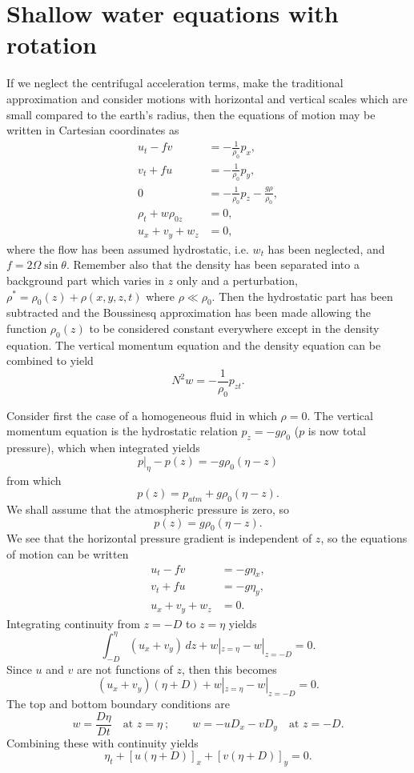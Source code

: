 \section{Shallow water equations with rotation}

If we neglect the centrifugal acceleration terms, make the traditional approximation
and consider motions with horizontal and vertical scales which are small compared to
the earth's radius, then the equations of motion may be written in Cartesian
coordinates as
\begin{align*}
	u_t-fv            & =-\frac{1}{\rho_0}p_x,                      \\
	v_t+fu            & =-\frac{1}{\rho_0}p_y,                      \\
	0                 & =-\frac{1}{\rho_0}p_z-\frac{g\rho}{\rho_0}, \\
	\rho_t+w\rho_{0z} & =0,                                         \\
	u_x+v_y+w_z       & =0,
\end{align*}
where the flow has been assumed hydrostatic, i.e. $w_t$ has been neglected, and
$f=2\Omega\sin\theta$. Remember also that the density has been separated into a background
part which varies in $z$ only and a perturbation, $\rho^*=\rho_0(z)+\rho(x,y,z,t)$ where
$\rho\ll\rho_0$. Then the hydrostatic part has been subtracted and the Boussinesq approximation has
been made allowing the function $\rho_0(z)$ to be considered constant everywhere except in
the density equation. The vertical momentum equation and the density equation can
be combined to yield
\[
	N^2w=-\frac{1}{\rho_0}p_{zt}.
\]

\sourcepagebreak

Consider first the case of a homogeneous fluid in which $\rho=0$. The vertical
momentum equation is the hydrostatic relation $p_z=-g\rho_0$ ($p$ is now total pressure),
which when integrated yields
\[
	p|_\eta-p(z)=-g\rho_0(\eta-z)
\]
from which
\[
	p(z)=p_{atm}+g\rho_0(\eta-z).
\]
We shall assume that the atmospheric pressure is zero, so
\[
	p(z)=g\rho_0(\eta-z).
\]
We see that the horizontal pressure gradient is independent of $z$, so the equations of
motion can be written
\begin{align*}
	u_t-fv      & =-g\eta_x, \\
	v_t+fu      & =-g\eta_y, \\
	u_x+v_y+w_z & =0.
\end{align*}
Integrating continuity from $z=-D$ to $z=\eta$ yields
\[
	\int_{-D}^{\eta}(u_x+v_y)\,dz+w|_{z=\eta}-w|_{z=-D}=0.
\]
Since $u$ and $v$ are not functions of $z$, then this becomes
\[
	(u_x+v_y)(\eta+D)+w|_{z=\eta}-w|_{z=-D}=0.
\]
The top and bottom boundary conditions are
\[
	w=\frac{D\eta}{Dt}\quad\text{at }z=\eta
	\ ;\qquad
	w=-uD_x-vD_y\quad\text{at }z=-D.
\]
Combining these with continuity yields
\[
	\eta_t+[u(\eta+D)]_x+[v(\eta+D)]_y=0.
\]


